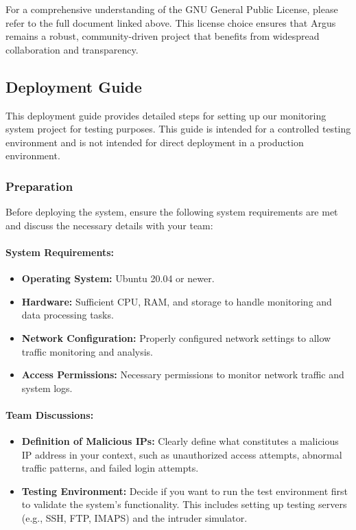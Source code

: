 \documentclass{article}
\begin{document}
    \noindent For a comprehensive understanding of the GNU General Public License, please refer to the full document linked above.
    This license choice ensures that Argus remains a robust, community-driven project that benefits from widespread collaboration and transparency.

    \newpage
    \subsection{Deployment Guide}\label{subsec:deployment-guide}

    This deployment guide provides detailed steps for setting up our monitoring system project for testing purposes.
    This guide is intended for a controlled testing environment and is not intended for direct deployment in a production environment.

    \subsubsection{Preparation}\label{subsubsec:preparation}

    Before deploying the system, ensure the following system requirements are met and discuss the necessary details with your team:

    \paragraph{System Requirements:}
    \begin{itemize}
        \item \textbf{Operating System:} Ubuntu 20.04 or newer.
        \item \textbf{Hardware:} Sufficient CPU, RAM, and storage to handle monitoring and data processing tasks.
        \item \textbf{Network Configuration:} Properly configured network settings to allow traffic monitoring and analysis.
        \item \textbf{Access Permissions:} Necessary permissions to monitor network traffic and system logs.
    \end{itemize}

    \paragraph{Team Discussions:}
    \begin{itemize}
        \item \textbf{Definition of Malicious IPs:} Clearly define what constitutes a malicious IP address in your context, such as unauthorized access attempts, abnormal traffic patterns, and failed login attempts.
        \item \textbf{Testing Environment:} Decide if you want to run the test environment first to validate the system's functionality.
        This includes setting up testing servers (e.g., SSH, FTP, IMAPS) and the intruder simulator.
    \end{itemize}
\end{document}
